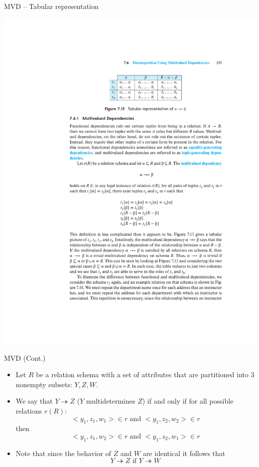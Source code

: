 \documentclass{beamer}
\begin{document}
\begin{frame}{MVD -- Tabular representation}
    \begin{center}
        \includegraphics[width=\textwidth, trim={7.5cm 19.75cm 5cm 4.5cm}, clip]{figures/p337_tabular}
    \end{center}
\end{frame}

\begin{frame}{MVD (Cont.)}
    \begin{itemize}
        \item Let $R$ be a relation schema with a set of attributes that are partitioned into 3 nonempty subsets: $Y, Z, W$.
        \item We say that $Y \twoheadrightarrow Z$ ($Y$ multidetermines $Z$) if and only if for all possible relations $r(R)$:
            \begin{equation*}
                < y_1, z_1, w_1 > \in r \text{ and } < y_1, z_2, w_2 > \in r
            \end{equation*}
            then
            \begin{equation*}
                < y_1, z_1, w_2 > \in r \text{ and } < y_1, z_2, w_1 > \in r
            \end{equation*}
        \item Note that since the behavior of $Z$ and $W$ are identical it follows that
            \begin{equation*}
                Y \twoheadrightarrow Z \text{ if } Y \twoheadrightarrow W
            \end{equation*}
    \end{itemize}

\end{frame}
\end{document}

